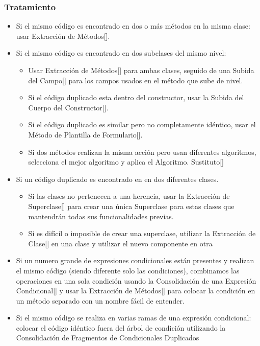 \documentclass[11pt,a4paper,oneside]{book}
\begin{document}
\subsubsection{Tratamiento}
\begin{itemize}
    \item Si el mismo código es encontrado en dos o más métodos en la misma clase: usar Extracción de Métodos[\pageref{extractmethod}].
    \item Si el mismo código es encontrado en dos subclases del mismo nivel:
    \begin{itemize}
        \item Usar Extracción de Métodos[\pageref{extractmethod}] para ambas clases, seguido de una Subida del Campo[\pageref{pullupfield}] para los campos usados en el método que sube de nivel.
        \item Si el código duplicado esta dentro del constructor, usar la Subida del Cuerpo del Constructor[\pageref{pullupconstructorbody}].
        \item Si el código duplicado es similar pero no completamente idéntico, usar el Método de Plantilla de Formulario[\pageref{formtemplatemethod}].
        \item Si dos métodos realizan la misma acción pero usan diferentes algoritmos, selecciona el mejor algoritmo y aplica el Algoritmo. Sustituto[\pageref{substitutealgorithm}]
    \end{itemize}
    \item Si un código duplicado es encontrado en en dos diferentes clases.
    \begin{itemize}
        \item Si las clases no pertenecen a una herencia, usar la Extracción de Superclase[\pageref{extractsubclass}] para crear una única Superclase para estas clases que mantendrán todas sus funcionalidades previas.
        \item Si es difícil o imposible de crear una superclase, utilizar la Extracción de Clase[\pageref{extractclass}] en una clase y utilizar el nuevo componente en otra
    \end{itemize}
    \item Si un numero grande de expresiones condicionales están presentes y realizan el mismo código (siendo diferente solo las condiciones), combinamos las operaciones en una sola condición usando la Consolidación de una Expresión Condicional[\pageref{}] y usar la Extracción de Métodos[\pageref{extractmethod}] para colocar la condición en un método separado con un nombre fácil de entender.
    \item Si el mismo código se realiza en varias ramas de una expresión condicional: colocar el código idéntico fuera del árbol de condición utilizando la Consolidación de Fragmentos de Condicionales Duplicados
\end{itemize}
\end{document}
